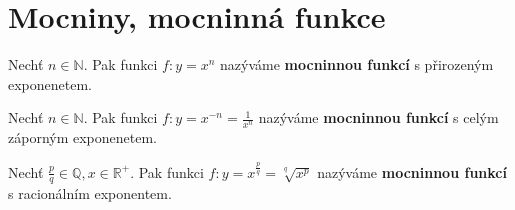 \section{Mocniny, mocninná funkce}
\begin{definition}
    Nechť $n\in \mathbb N.$ Pak funkci $f: y=x^n$ nazýváme \textbf{mocninnou funkcí}
    s přirozeným exponenetem.
\end{definition}

\begin{definition}
    Nechť $n\in \mathbb N.$ Pak funkci $f: y=x^{-n}=\frac{1}{x^n}$ nazýváme
    \textbf{mocninnou funkcí} s celým záporným exponenetem.
\end{definition}

\begin{definition}
    Nechť $\frac{p}{q}\in \mathbb Q, x \in \mathbb R^+.$ Pak funkci $f: y=
    x^{\frac{p}{q}}=\sqrt[q]{x^p}$ nazýváme \textbf{mocninnou funkcí}
    s racionálním exponentem.
\end{definition}
